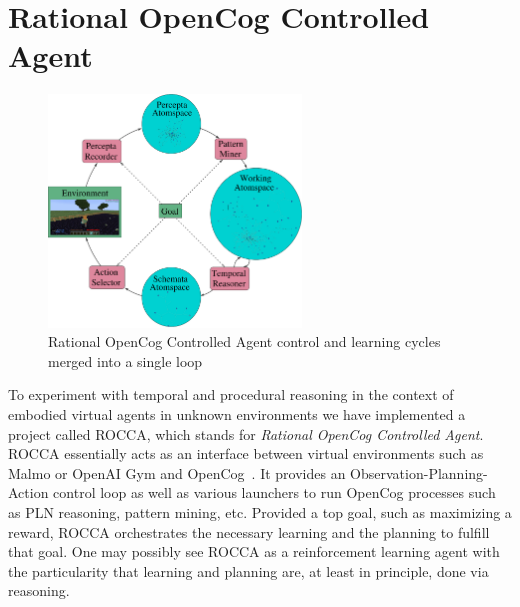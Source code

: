 \documentclass[runningheads]{llncs}
\begin{document}
\section{Rational OpenCog Controlled Agent}
\label{sec:rocca}
\begin{figure}
  \centerline{\includegraphics[width=0.6\textwidth]{pictures/rocca-chart-v0.7.pdf}}
  \caption{Rational OpenCog Controlled Agent control and learning
    cycles merged into a single loop}
  \label{fig:rocca}
\end{figure}
To experiment with temporal and procedural reasoning in the context of
embodied virtual agents in unknown environments we have implemented a
project called ROCCA, which stands for \emph{Rational OpenCog
  Controlled Agent}.  ROCCA essentially acts as an interface between
virtual environments such as Malmo \cite{Johnson2016} or OpenAI Gym
\cite{Brockman2016} and OpenCog~\cite{Hart2008}.  It provides an
Observation-Planning-Action control loop as well as various launchers
to run OpenCog processes such as PLN reasoning, pattern mining, etc.
Provided a top goal, such as maximizing a reward, ROCCA orchestrates
the necessary learning and the planning to fulfill that goal.
One may possibly see ROCCA as a reinforcement learning agent with the
particularity that learning and planning are, at least in principle,
done via reasoning.
\end{document}
